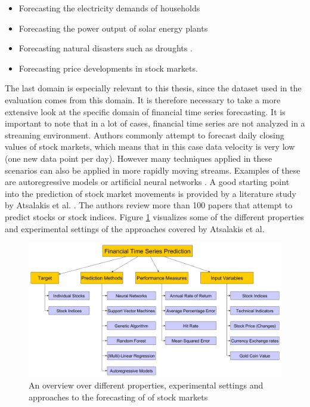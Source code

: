 \begin{itemize}
	\item Forecasting the electricity demands of households \cite{veit2014household}
	\item Forecasting the power output of solar energy plants \cite{inman2013solar}
	\item Forecasting natural disasters such as droughts \cite{mishra2006drought}.
	\item Forecasting price developments in stock markets.
\end{itemize}

The last domain is especially relevant to this thesis, since the dataset used in the evaluation comes from this domain. It is therefore necessary to take a more extensive look at the specific domain of financial time series forecasting. It is important to note that in a lot of cases, financial time series are not analyzed in a streaming environment. Authors commonly attempt to forecast daily closing values of stock markets, which means that in this case data velocity is very low (one new data point per day). However many techniques applied in these scenarios can also be applied in more rapidly moving streams. Examples of these are autoregressive models \cite{terasvirta1994specification} or artificial neural networks \cite{gama2010knowledge}. \newline
A good starting point into the prediction of stock market movements is provided by a literature study by Atsalakis et al. \cite{atsalakis2009surveying}. The authors review more than 100 papers that attempt to predict stocks or stock indices. Figure \ref{fig_financialTimeSeriesPredictionOverview} visualizes some of the different properties and experimental settings of the approaches covered by Atsalakis et al.

\begin{figure}[h]
	\centering
  	\includegraphics[width=\textwidth]{financialTimeSeriesPredictionOverview}
	\caption[Prediction in Financial Time Series Overview]{An overview over different properties, experimental settings and approaches to the forecasting of of stock markets}
	\label{fig_financialTimeSeriesPredictionOverview}
\end{figure}

